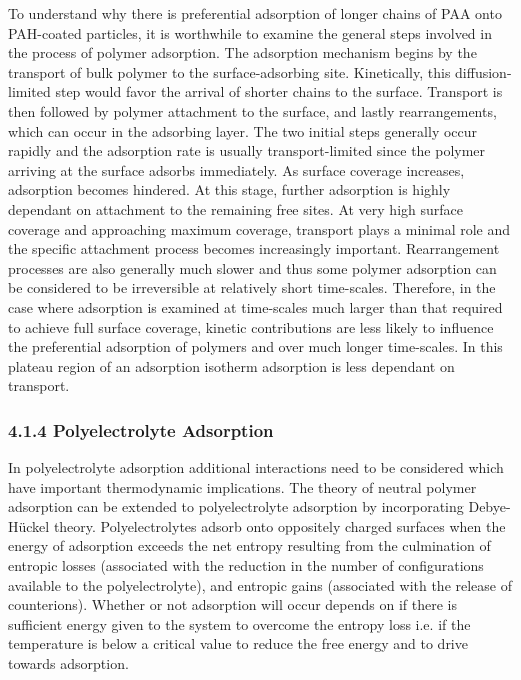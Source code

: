 \documentclass[journal=mamobx,manuscript=article]{achemso}
\begin{document}
To understand why there is preferential adsorption of longer chains of PAA onto PAH-coated particles, it is worthwhile to examine the general steps involved in the process of polymer adsorption.  The adsorption mechanism begins by the transport of bulk polymer to the surface-adsorbing site.  Kinetically, this diffusion-limited step would favor the arrival of shorter chains to the surface.  Transport is then followed by polymer attachment to the surface, and lastly rearrangements, which can occur in the adsorbing layer.  The two initial steps generally occur rapidly and the adsorption rate is usually transport-limited since the polymer arriving at the surface adsorbs immediately.\cite{Dijt1990} As surface coverage increases, adsorption becomes hindered.  At this stage, further adsorption is highly dependant on attachment to the remaining free sites.\cite{Hoogeveen1996}  At very high surface coverage and approaching maximum coverage, transport plays a minimal role and the specific attachment process becomes increasingly important.\cite{Hoogeveen1996} Rearrangement processes are also generally much slower and thus some polymer adsorption can be considered to be irreversible at relatively short time-scales.\cite{Cafe1982,Meadows1988}  Therefore, in the case where adsorption is examined at time-scales much larger than that required to achieve full surface coverage, kinetic contributions are less likely to influence the preferential adsorption of polymers and over much longer time-scales.  In this plateau region of an adsorption isotherm adsorption is less dependant on transport.\cite{Hoogeveen1996}



\subsubsection{4.1.4 Polyelectrolyte Adsorption}


In polyelectrolyte adsorption additional interactions need to be considered which have important thermodynamic implications. The theory of neutral polymer adsorption can be extended to polyelectrolyte adsorption by incorporating Debye-H\"uckel theory.\cite{Chatellier1996}  Polyelectrolytes adsorb onto oppositely charged surfaces when the energy of adsorption exceeds the net entropy resulting from the culmination of entropic losses (associated with the reduction in the number of configurations available to the polyelectrolyte), and entropic gains (associated with the release of counterions).  Whether or not adsorption will occur depends on if there is sufficient energy given to the system to overcome the entropy loss i.e. if the temperature is below a critical value to reduce the free energy and to drive towards adsorption.
\end{document}
